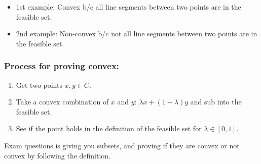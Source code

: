 \begin{example}
    \begin{itemize}
        \item 1st example: Convex b/c all line segments between two points are in the feasible set. 
        \item 2nd example: Non-convex b/c not all line segments between two points are in the feasible set.
    \end{itemize}
\end{example}

\subsubsection{Process for proving convex:}
\begin{process}
    \begin{enumerate}
        \item Get two points $x, y \in C$.
        \item Take a convex combination of $x$ and $y$: $\lambda x + (1 - \lambda)y$ and sub into the feasible set.
        \item See if the point holds in the definition of the feasible set for $\lambda \in [0, 1]$.
    \end{enumerate}
\end{process}

\begin{warning}
    Exam questions is giving you subsets, and proving if they are convex or not convex by following the definition. 
\end{warning}


